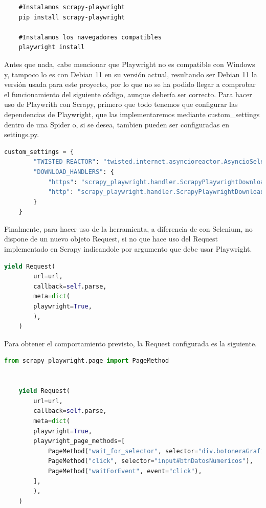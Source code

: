 \begin{verbatim}
	#Instalamos scrapy-playwright
	pip install scrapy-playwright
	
	#Instalamos los navegadores compatibles
	playwright install
\end{verbatim}

Antes que nada, cabe mencionar que Playwright no es compatible con Windows y, tampoco lo es con Debian 11 en su versión actual, resultando ser Debian 11 la versión usada para este proyecto, por lo que no se ha podido llegar a comprobar el funcionamiento del siguiente código, aunque debería ser correcto.\newline
\newline
Para hacer uso de Playwrith con Scrapy, primero que todo tenemos que configurar las dependencias de Playwright, que las implementaremos mediante custom\_settings dentro de una Spider o, si se desea, tambien pueden ser configuradas en settings.py.

\begin{lstlisting}[language=Python, caption={Configuración Playwright}]
	custom_settings = {
		"TWISTED_REACTOR": "twisted.internet.asyncioreactor.AsyncioSelectorReactor",
		"DOWNLOAD_HANDLERS": {
			"https": "scrapy_playwright.handler.ScrapyPlaywrightDownloadHandler",
			"http": "scrapy_playwright.handler.ScrapyPlaywrightDownloadHandler",
		}
	}
\end{lstlisting}

Finalmente, para hacer uso de la herramienta, a diferencia de con Selenium, no dispone de un nuevo objeto Request, si no que hace uso del Request implementado en Scrapy indicandole por argumento que debe usar Playwright.

\begin{lstlisting}[language=Python, caption={Playwright basic Request}]
	yield Request(
		url=url,
		callback=self.parse,
		meta=dict(
		playwright=True,
		),
	)
\end{lstlisting}

Para obtener el comportamiento previsto, la Request configurada es la siguiente.

\begin{lstlisting}[language=Python, caption={Agua en Navarra Playwright Request}]
	from scrapy_playwright.page import PageMethod
	
	
	yield Request(
		url=url,
		callback=self.parse,
		meta=dict(
		playwright=True,
		playwright_page_methods=[
			PageMethod("wait_for_selector", selector="div.botoneraGrafico", state="visible"),
			PageMethod("click", selector="input#btnDatosNumericos"),
			PageMethod("waitForEvent", event="click"),
		],
		),
	)
\end{lstlisting}


